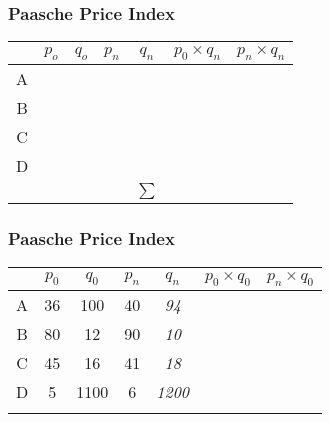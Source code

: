 \documentclass{beamer}
\begin{document}
\begin{frame}
\frametitle{Paasche Price Index}
\LARGE
\begin{center}
\begin{tabular}{|c||c|c|c|c||c|c|}
\hline  & $p_o$ & $q_o$ & $p_n$ & $q_n$ &$p_0 \times q_n$& $p_n \times q_n$   \\ 
\hline A &  &  & & & & \\ 
\hline B &  &  & & &  &\\ 
\hline C &  &  &&  &  &\\ 
\hline D &  &  &&  &  &\\ \hline
\hline  &  &  & & $\sum$ &  &\\ 
\hline 
\end{tabular} 
\end{center}

\end{frame}
\begin{frame}
\frametitle{Paasche Price Index}
\begin{center}
\LARGE
\begin{tabular}{|c||c|c||c|c||c|c|}
\hline  &\phantom{s}$p_0$\phantom{s}	&	$q_0$	&	$p_n$	&	$q_n$	&	$p_0 \times q_0$	&	$p_n \times q_0$	\\	\hline \hline
A & 36	&	100	&	40	&	\textit{94}	&	\phantom{3600}	&	\phantom{4000}	\\	\hline
B & 80	&	12	&	90	&	\textit{10}	&	\phantom{960}	&	\phantom{1080}	\\	\hline
C & 45	&	16	&	41	&	\textit{18}	&	\phantom{720}	&	\phantom{656}	\\	\hline
D & 5	&	1100	&	6	&	\textit{1200}	&	\phantom{5500}	&	\phantom{6600}	\\	\hline \hline
& 	&		&		&		&	\phantom{10780}	&	\phantom{12336}	\\	\hline
\end{tabular} 
\end{center}
\end{frame}
\end{document}
